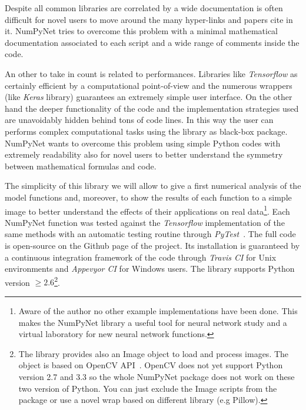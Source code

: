 \documentclass{standalone}
\begin{document}
Despite all common libraries are correlated by a wide documentation is often difficult for novel users to move around the many hyper-links and papers cite in it.
NumPyNet tries to overcome this problem with a minimal mathematical documentation associated to each script and a wide range of comments inside the code.

An other  to take in count is related to performances.
Libraries like \emph{Tensorflow} as certainly efficient by a computational point-of-view and the numerous wrappers (like \emph{Keras} library) guarantees an extremely simple user interface.
On the other hand the deeper functionality of the code and the implementation strategies used are unavoidably hidden behind tons of code lines.
In this way the user can performs complex computational tasks using the library as black-box package.
NumPyNet wants to overcome this problem using simple Python codes with extremely readability also for novel users to better understand the symmetry between mathematical formulas and code.

The simplicity of this library we will allow to give a first numerical analysis of the model functions and, moreover, to show the results of each function to a simple image to better understand the effects of their applications on real data\footnote{
  Aware of the author no other example implementations have been done.
  This makes the NumPyNet library a useful tool for neural network study and a virtual laboratory for new neural network functions.
}.
Each NumPyNet function was tested against the \emph{Tensorflow} implementation of the same methods with an automatic testing routine through \emph{PyTest}~\cite{Okken:2017:PTP:3176124}.
The full code is open-source on the Github page of the project.
Its installation is guaranteed by a continuous integration framework of the code through \emph{Travis CI} for Unix environments and \emph{Appevyor CI} for Windows users.
The library supports Python version $\ge2.6$\footnote{
  The library provides also an \textsf{Image} object to load and process images.
  The object is based on OpenCV API~\cite{OpenCV}.
  OpenCV does not yet support Python version 2.7 and 3.3 so the whole NumPyNet package does not work on these two version of Python.
  You can just exclude the \textsf{Image} scripts from the package or use a novel wrap based on different library (e.g \textsf{Pillow}).
}.
\end{document}
